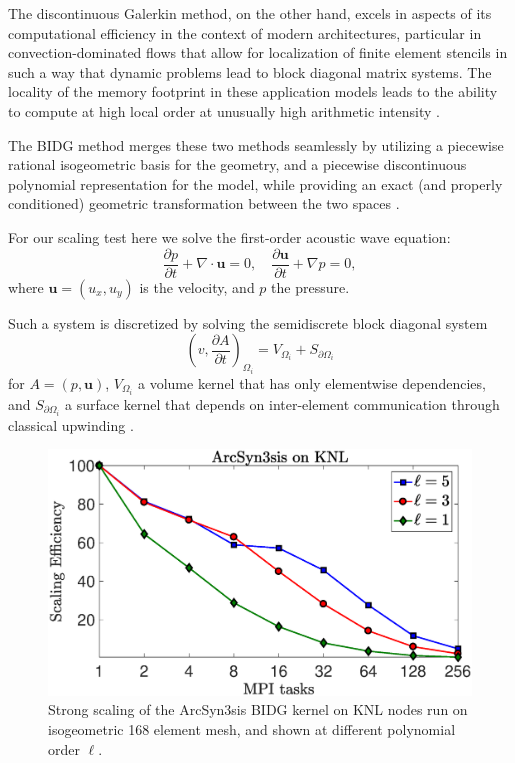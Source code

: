 The discontinuous Galerkin method, on the other hand, excels in aspects of its computational efficiency in the context of modern architectures, particular in convection-dominated flows that allow for localization of finite element stencils in such a way that dynamic problems lead to block diagonal matrix systems.  The locality of the memory footprint in these application models leads to the ability to compute at high local order at unusually high arithmetic intensity \cite{Klockner20097863}.

The BIDG method merges these two methods seamlessly by utilizing a piecewise rational isogeometric basis for the geometry, and a piecewise discontinuous polynomial representation for the model, while providing an exact (and properly conditioned) geometric transformation between the two spaces  \cite{Michoski2016658}.

For our scaling test here we solve the first-order acoustic wave equation: \begin{equation} \label{awe} \frac{\partial p}{\partial t} + \nabla\cdot \boldsymbol{u} = 0, \quad  \frac{\partial\boldsymbol{u}}{\partial t} + \nabla p = 0, \end{equation} where $\boldsymbol{u}=(u_x,u_y)$ is the velocity, and $p$ the pressure.

Such a system is discretized by solving the semidiscrete block diagonal system \[ \left( v, \frac{ \partial A}{\partial t} \right)_{\Omega_{i}}= V_{\Omega_{i}}+S_{\partial\Omega_{i}} \] for $A = (p,\boldsymbol{u})$, $V_{\Omega_{i}}$ a volume kernel that has only elementwise dependencies, and $S_{\partial\Omega_{i}}$ a surface kernel that depends on inter-element communication through classical upwinding \cite{Michoski2014898}.  


\begin{figure}[h]
\begin{center}
\includegraphics[width=0.99\linewidth]{./bidg_data/2nd_try/scaling}
\end{center}
\vspace*{-.5cm}
\caption{Strong scaling of the ArcSyn3sis BIDG kernel on KNL nodes run on isogeometric 168 element mesh, and shown at different polynomial order $\ell$.}
\label{fig:bidg_scaling}
\end{figure}


